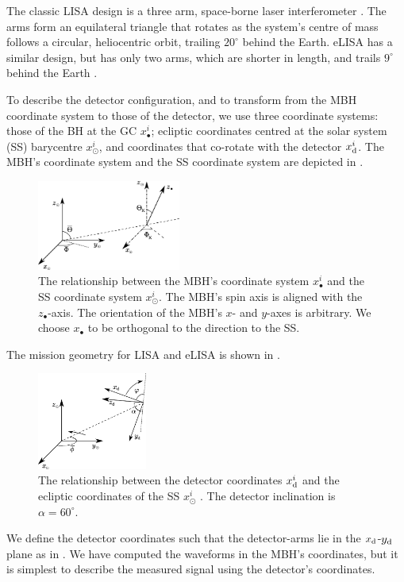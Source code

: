 The classic LISA design is a three arm, space-borne laser interferometer \citep{Bender1998, Danzmann2003}. The arms form an equilateral triangle that rotates as the system's centre of mass follows a circular, heliocentric orbit, trailing $20^{\circ}$ behind the Earth. eLISA has a similar design, but  has only two arms, which are shorter in length, and trails $9^{\circ}$ behind the Earth \citep{Jennrich2011}.

To describe the detector configuration, and to transform from the MBH coordinate system to those of the detector, we use three coordinate systems: those of the BH at the GC $x_\bullet^i$; ecliptic coordinates centred at the solar system (SS) barycentre $x_\odot^i$, and coordinates that co-rotate with the detector $x_\mathrm{d}^i$. The MBH's coordinate system and the SS coordinate system are depicted in .
\begin{figure}
\centering
 \includegraphics[width=0.42\textwidth]{./images/BH_SS_angles}
    \caption{The relationship between the MBH's coordinate system $x_\bullet^i$ and the SS coordinate system $x_\odot^i$. The MBH's spin axis is aligned with the $z_\bullet$-axis. The orientation of the MBH's $x$- and $y$-axes is arbitrary. We choose $x_\bullet$ to be orthogonal to the direction to the SS.}
   \label{fig:BH_SS}
\end{figure}
The mission geometry for LISA and eLISA is shown in .
\begin{figure}
\centering
 \includegraphics[width=0.32\textwidth]{./images/SS_LISA}
    \caption{The relationship between the detector coordinates $x_\mathrm{d}^i$ and the ecliptic coordinates of the SS $x_\odot^i$ \citep{Bender1998, Jennrich2011}. The detector inclination is $\alpha = 60^{\circ}$.}
   \label{fig:SS_LISA}
\end{figure}
We define the detector coordinates such that the detector-arms lie in the $x_\mathrm{d}$-$y_\mathrm{d}$ plane as in \citet{Cutler1998}. We have computed the waveforms in the MBH's coordinates, but it is simplest to describe the measured signal using the detector's coordinates.

